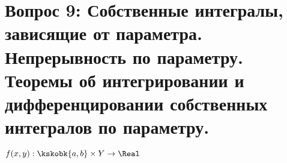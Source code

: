 \section{Вопрос 9: Собственные интегралы, зависящие от параметра. Непрерывность по параметру. Теоремы об интегрировании и дифференцировании собственных интегралов по параметру.}

\begin{defs}
	$f(x,y) : \kskobk{a,b} \times Y \to \Real$
\end{defs}
